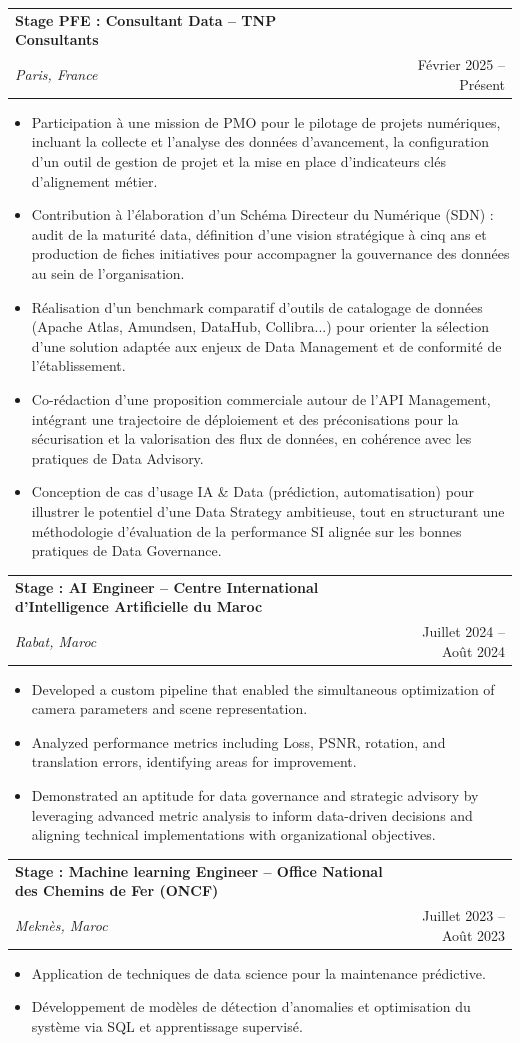 \documentclass[a4paper,11pt]{article}
\makeatletter
\newcommand{\resumeSubheading}[4]{
\vspace{0.5mm}\item
    \begin{tabular*}{0.98\textwidth}[t]{l@{\extracolsep{\fill}}r}
        \textbf{#1} & \textit{\footnotesize{#4}} \\
        \textit{\footnotesize{#3}} &  \footnotesize{#2}\\
    \end{tabular*}
    \vspace{-2.4mm}
}
\newcommand{\resumeItemListStart}{\begin{justify}\begin{itemize}[leftmargin=3ex, rightmargin=2ex, noitemsep,labelsep=1.2mm,itemsep=0mm]\small}
\newcommand{\resumeItemListEnd}{\end{itemize}\end{justify}\vspace{-2mm}}
\makeatother
\begin{document}
    \resumeSubheading
  {Stage PFE : Consultant Data – TNP Consultants}{Février 2025 – Présent}
  {Paris, France}{}
  \resumeItemListStart
    \item {Participation à une mission de PMO pour le pilotage de projets numériques, incluant la collecte et l’analyse des données d’avancement, la configuration d’un outil de gestion de projet et la mise en place d’indicateurs clés d’alignement métier.}
    \item {Contribution à l’élaboration d’un Schéma Directeur du Numérique (SDN) : audit de la maturité data, définition d’une vision stratégique à cinq ans et production de fiches initiatives pour accompagner la gouvernance des données au sein de l’organisation.}
    \item {Réalisation d’un benchmark comparatif d’outils de catalogage de données (Apache Atlas, Amundsen, DataHub, Collibra...) pour orienter la sélection d’une solution adaptée aux enjeux de Data Management et de conformité de l’établissement.}
    \item {Co-rédaction d’une proposition commerciale autour de l’API Management, intégrant une trajectoire de déploiement et des préconisations pour la sécurisation et la valorisation des flux de données, en cohérence avec les pratiques de Data Advisory.}
    \item {Conception de cas d’usage IA \& Data (prédiction, automatisation) pour illustrer le potentiel d’une Data Strategy ambitieuse, tout en structurant une méthodologie d’évaluation de la performance SI alignée sur les bonnes pratiques de Data Governance.}
  \resumeItemListEnd
    \resumeSubheading
  {Stage : AI Engineer  – Centre International d’Intelligence Artificielle du Maroc}{Juillet 2024 – Août 2024}
  {Rabat, Maroc}{}
  \resumeItemListStart
    \item {Developed a custom pipeline that enabled the simultaneous optimization of camera parameters and scene representation.}
    \item {Analyzed performance metrics including Loss, PSNR, rotation, and translation errors, identifying areas for improvement.}
    \item {Demonstrated an aptitude for data governance and strategic advisory by leveraging advanced metric analysis to inform data-driven decisions and aligning technical implementations with organizational objectives.}
  \resumeItemListEnd


    \resumeSubheading
      {Stage : Machine learning Engineer – Office National des Chemins de Fer (ONCF)}{Juillet 2023 – Août 2023}
      {Meknès, Maroc}{}
      \resumeItemListStart
        \item {Application de techniques de data science pour la maintenance prédictive.}
        \item {Développement de modèles de détection d’anomalies et optimisation du système via SQL et apprentissage supervisé.}
      \resumeItemListEnd
\end{document}
